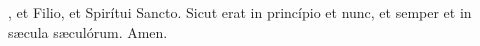 , et Filio, et Spirítui Sancto. Sicut erat in princípio et nunc, et semper et in s{\ae}cula s{\ae}culórum. Amen.
